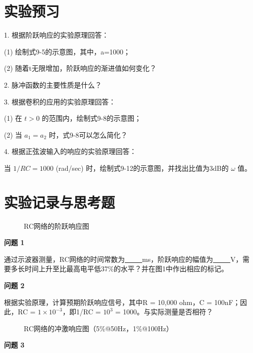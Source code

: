 \documentclass{sasreport}
\begin{document}
\maketitle

\section{实验预习}
1. 根据阶跃响应的实验原理回答：

(1) 绘制式9-5的示意图，其中，a=1000；

(2) 随着t无限增加，阶跃响应的渐进值如何变化？

2. 脉冲函数的主要性质是什么？

3. 根据卷积的应用的实验原理回答：

(1) 在 $t>0$ 的范围内，绘制式9-8的示意图；

(2) 当 $a_1=a_2$ 时，式9-8可以怎么简化？

4. 根据正弦波输入的响应的实验原理回答：

当 $1/RC = 1000$ (rad/sec) 时，绘制式9-12的示意图，并找出比值为3dB的 $\omega$ 值。

\section{实验记录与思考题}
\begin{figure}[H]
    \caption{RC网络的阶跃响应图}
    \centering

\end{figure}

\textbf{问题 1}

通过示波器测量，RC网络的时间常数为\underline{\ \ \ \ \ }ms，阶跃响应的幅值为\underline{\ \ \ \ \ }V，需要多长时间上升至比最高电平低37\%的水平？并在图1中作出相应的标记。

\textbf{问题 2}

根据实验原理，计算预期阶跃响应信号，其中R = 10,000 ohm，C = 100nF；因此，RC = $1\times 10^{-3}$，即1/RC = $10^3$ = 1000。与实际测量是否相符？

\begin{figure}[H]
    \caption{RC网络的冲激响应图（5\%@50Hz，1\%@100Hz）}

\end{figure}

\textbf{问题 3}
\end{document}
